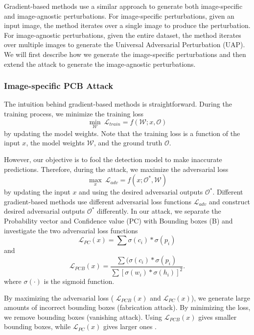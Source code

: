 Gradient-based methods use a similar approach to generate both image-specific and image-agnostic perturbations. For image-specific perturbations, given an input image, the method iterates over a single image to produce the perturbation. 
For image-agnostic perturbations, given the entire dataset, the method iterates over multiple images to generate the Universal Adversarial Perturbation (UAP). We will first describe how we generate the image-specific perturbations and then extend the attack to generate the image-agnostic perturbations.

\subsubsection{\textbf{Image-specific PCB Attack}}

The intuition behind gradient-based methods is straightforward. During the training process, we minimize the training loss 
\begin{equation}
\min_{\mathcal{W}} \ \mathcal{L}_{train} = f(\mathcal{W}; x, \mathcal{O})
\end{equation}
by updating the model weights. Note that the training loss is a function of the input $x$, the model weights $\mathcal{W}$, and the ground truth $\mathcal{O}$. 

However, our objective is to fool the detection model to make inaccurate predictions. Therefore, during the attack, we maximize the adversarial loss 
\begin{equation}
\label{eq_adversarial_opt}
\max_{x} \ \mathcal{L}_{adv} = f(x; \mathcal{O}^{\ast}, \mathcal{W})
\end{equation}
by updating the input $x$ and using the desired adversarial outputs $\mathcal{O}^{\ast}$. Different gradient-based methods use different adversarial loss functions $\mathcal{L}_{adv}$ and construct desired adversarial outputs $\mathcal{O}^{\ast}$ differently. In our attack, we separate the Probability vector and Confidence value (PC) with Bounding boxes (B) and investigate the two adversarial loss functions
\begin{equation}
\mathcal{L}_{PC}(x) = \sum{\sigma(c_i) * \sigma(p_i)}
\end{equation}
and
\begin{equation}
\mathcal{L}_{PCB}(x) = \frac{\sum{(\sigma(c_i) * \sigma(p_i)}}{\sum{[\sigma(w_i) * \sigma(h_i)]^2}}.
\end{equation}
where $\sigma(\cdot)$ is the sigmoid function. 

By maximizing the adversarial loss ( $\mathcal{L}_{PCB}(x)$ and $\mathcal{L}_{PC}(x)$), we generate large amounts of incorrect bounding boxes (fabrication attack). By minimizing the loss, we remove bounding boxes (vanishing attack).  Using $\mathcal{L}_{PCB}(x)$ gives smaller bounding boxes, while $\mathcal{L}_{PC}(x)$ gives larger ones .

